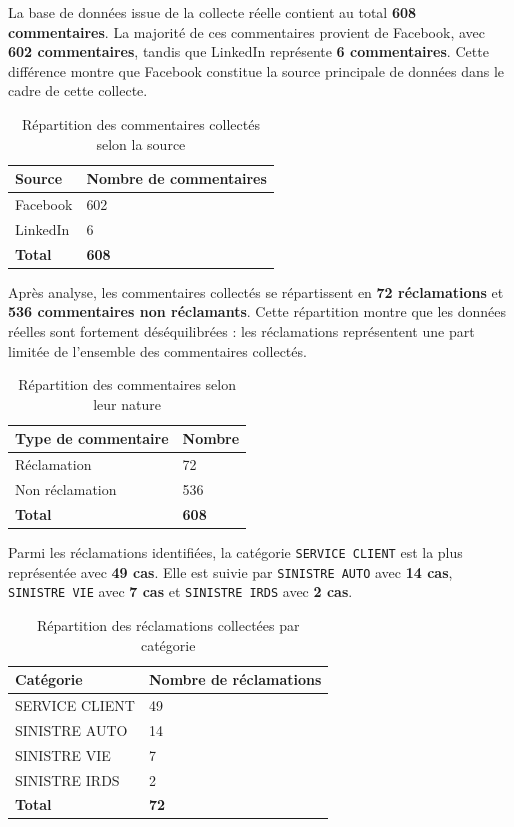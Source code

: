 \documentclass[12pt,a4paper,oneside]{report}
\begin{document}
La base de données issue de la collecte réelle contient au total
\textbf{608 commentaires}. La majorité de ces commentaires provient de
Facebook, avec \textbf{602 commentaires}, tandis que LinkedIn représente
\textbf{6 commentaires}. Cette différence montre que Facebook constitue la
source principale de données dans le cadre de cette collecte.

\begin{table}[H]
\centering
\caption{Répartition des commentaires collectés selon la source}
\label{tab:repartition_sources_collecte}
\begin{tabular}{|p{7cm}|p{4cm}|}
\hline
\textbf{Source} & \textbf{Nombre de commentaires} \\
\hline
Facebook & 602 \\
\hline
LinkedIn & 6 \\
\hline
\textbf{Total} & \textbf{608} \\
\hline
\end{tabular}
\end{table}

Après analyse, les commentaires collectés se répartissent en
\textbf{72 réclamations} et \textbf{536 commentaires non réclamants}.
Cette répartition montre que les données réelles sont fortement déséquilibrées :
les réclamations représentent une part limitée de l'ensemble des commentaires
collectés.

\begin{table}[H]
\centering
\caption{Répartition des commentaires selon leur nature}
\label{tab:repartition_reclamations_collecte}
\begin{tabular}{|p{7cm}|p{4cm}|}
\hline
\textbf{Type de commentaire} & \textbf{Nombre} \\
\hline
Réclamation & 72 \\
\hline
Non réclamation & 536 \\
\hline
\textbf{Total} & \textbf{608} \\
\hline
\end{tabular}
\end{table}

Parmi les réclamations identifiées, la catégorie \texttt{SERVICE CLIENT} est
la plus représentée avec \textbf{49 cas}. Elle est suivie par
\texttt{SINISTRE AUTO} avec \textbf{14 cas}, \texttt{SINISTRE VIE} avec
\textbf{7 cas} et \texttt{SINISTRE IRDS} avec \textbf{2 cas}.

\begin{table}[H]
\centering
\caption{Répartition des réclamations collectées par catégorie}
\label{tab:repartition_categories_collecte}
\begin{tabular}{|p{7cm}|p{4cm}|}
\hline
\textbf{Catégorie} & \textbf{Nombre de réclamations} \\
\hline
SERVICE CLIENT & 49 \\
\hline
SINISTRE AUTO & 14 \\
\hline
SINISTRE VIE & 7 \\
\hline
SINISTRE IRDS & 2 \\
\hline
\textbf{Total} & \textbf{72} \\
\hline
\end{tabular}
\end{table}
\end{document}
